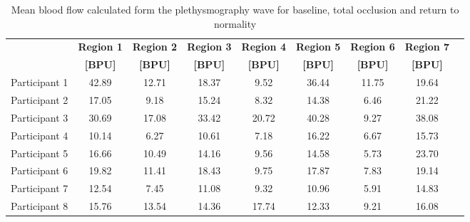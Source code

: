 \begin{table}[!htbp]
	\caption{Mean blood flow calculated form the plethysmography wave for baseline, total occlusion and return to normality}
	\label{tbl:LDF_flow}
	\centering \small
	\begin{tabular}{lcccccccc}
		\toprule
		& \textbf{Region 1}
		& \textbf{Region 2}
		& \textbf{Region 3}
		& \textbf{Region 4}
		& \textbf{Region 5}
		& \textbf{Region 6}
		& \textbf{Region 7} \\
		& \textbf{[BPU]}
		& \textbf{[BPU]}
		& \textbf{[BPU]}		
		& \textbf{[BPU]}		
		& \textbf{[BPU]}
		& \textbf{[BPU]}
		& \textbf{[BPU]}\\\midrule
		Participant 1    &     42.89     &     12.71     &     18.37     &      9.52     &     36.44     &     11.75     &     19.64     \\  
		Participant 2    &     17.05     &      9.18     &     15.24     &      8.32     &     14.38     &      6.46     &     21.22     \\  
		Participant 3    &     30.69     &     17.08     &     33.42     &     20.72     &     40.28     &      9.27     &     38.08     \\  
		Participant 4    &     10.14     &      6.27     &     10.61     &      7.18     &     16.22     &      6.67     &     15.73     \\  
		Participant 5    &     16.66     &     10.49     &     14.16     &      9.56     &     14.58     &      5.73     &     23.70     \\  
		Participant 6    &     19.82     &     11.41     &     18.43     &      9.75     &     17.87     &      7.83     &     19.14     \\  
		Participant 7    &     12.54     &      7.45     &     11.08     &      9.32     &     10.96     &      5.91     &     14.83     \\  
		Participant 8    &     15.76     &     13.54     &     14.36     &     17.74     &     12.33     &      9.21     &     16.08     \\  
 		\bottomrule
\end{tabular}
\end{table}



